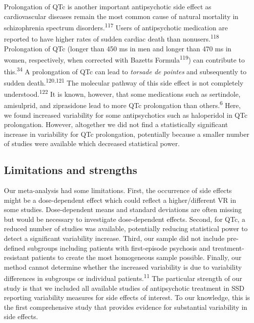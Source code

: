 \documentclass[
  9pt,
  english,
  ,jou,floatsintext]{apa6}
\begin{document}
Prolongation of QTc is another important antipsychotic side effect as
cardiovascular diseases remain the most common cause of natural
mortality in schizophrenia spectrum disorders.\textsuperscript{117} Users of
antipsychotic medication are reported to have higher rates of sudden
cardiac death than nonusers.\textsuperscript{118} Prolongation of QTc (longer
than 450 ms in men and longer than 470 ms in women, respectively, when
corrected with Bazetts Formula\textsuperscript{119}) can contribute to
this.\textsuperscript{34} A prolongation of QTc can lead to \emph{torsade de
pointes} and subsequently to sudden death.\textsuperscript{120,121} The molecular pathway of this side effect is not
completely understood.\textsuperscript{122} It is known, however, that some
medications such as sertindole, amisulprid, and ziprasidone lead to
more QTc prolongation than others.\textsuperscript{6} Here, we found increased
variability for some antipsychotics such as haloperidol in QTc
prolongation. However, altogether we did not find a statistically
significant increase in variability for QTc prolongation, potentially
because a smaller number of studies were available which decreased
statistical power.

\hypertarget{limitations-and-strengths}{%
\subsection{Limitations and strengths}\label{limitations-and-strengths}}

Our meta-analysis had some limitations. First, the occurrence of side
effects might be a dose-dependent effect which could reflect a
higher/different VR in some studies. Dose-dependent means and standard
deviations are often missing but would be necessary to investigate
dose-dependent effects. Second, for QTc, a reduced number of studies was
available, potentially reducing statistical power to detect a
significant variability increase. Third, our sample did not include
pre-defined subgroups including patients with first-episode psychosis
and treatment-resistant patients to create the most homogeneous sample
possible. Finally, our method cannot determine
whether the increased variability is due to variability differences in
subgroups or individual patients.\textsuperscript{11} The particular strength
of our study is that we included all available studies of antipsychotic
treatment in SSD reporting variability measures for side effects of
interest. To our knowledge, this is the first comprehensive study that
provides evidence for substantial variability in side effects.
\end{document}
